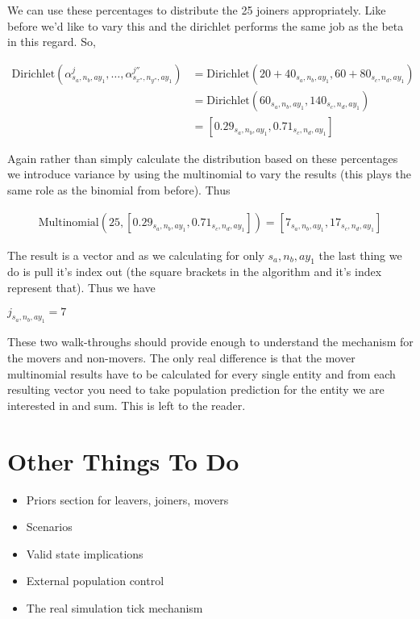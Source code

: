 \documentclass[margin=5mm]{article}
\begin{document}
We can use these percentages to distribute the 25 joiners
appropriately.  Like before we'd like to vary this and the dirichlet
performs the same job as the beta in this regard. So,

\begin{equation*}
  \begin{split}
\text{Dirichlet}(\alpha^{j}_{s_a,n_b,ay_1}, \dots,
\alpha^{j''}_{s_{x''},n_{y''},ay_{1}}) & =  \text{Dirichlet}(20 +
40_{s_a,n_b,ay_1}, 60 + 80_{s_c,n_d,ay_1}) \\
& = \text{Dirichlet}(60_{s_a,n_b,ay_1}, 140_{s_c,n_d,ay_1}) \\
& = [0.29_{s_a,n_b,ay_1}, 0.71_{s_c,n_d,ay_1}]
  \end{split}
\end{equation*}

Again rather than simply calculate the distribution based on these
percentages we introduce variance by using the multinomial to vary the
results (this plays the same role as the binomial from before).  Thus

\begin{equation*}
  \begin{split}
\text{Multinomial}(25, [0.29_{s_a,n_b,ay_1}, 0.71_{s_c,n_d,ay_1}]) = [
7_{s_a,n_b,ay_1}, 17_{s_c,n_d,ay_1}]
  \end{split}
\end{equation*}

The result is a vector and as we calculating for only ${s_a,n_b,ay_1}$
the last thing we do is pull it's index out (the square brackets in
the algorithm and it's index represent that).  Thus we have

$j_{s_a,n_b,ay_1} = 7$

These two walk-throughs should provide enough to understand the
mechanism for the movers and non-movers.  The only real difference is
that the mover multinomial results have to be calculated for every
single entity and from each resulting vector you need to take
population prediction for the entity we are interested in and sum.
This is left to the reader.


\section{Other Things To Do}

\begin{itemize}
\item Priors section for leavers, joiners, movers
\item Scenarios
\item Valid state implications
\item External population control
\item The real simulation tick mechanism
\end{itemize}
\end{document}
